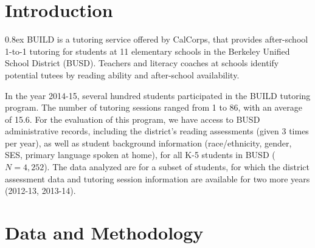 \documentclass[a0,landscape]{a0poster}
\begin{document}
\vspace{0.5cm} %



\begin{multicols}{3} %



\color{SaddleBrown} %

\section*{Introduction}

\parskip 0.8ex
BUILD is a tutoring service offered by CalCorps, that provides
after-school 1-to-1 tutoring for students at 11 elementary schools
in the Berkeley Unified School District (BUSD).
Teachers and literacy coaches at schools identify potential tutees
by reading ability and after-school availability.

In the year 2014-15, several hundred students participated in the
BUILD tutoring program. The number of tutoring sessions ranged
from 1 to 86, with an average of 15.6.
For the evaluation of this program, we have access to BUSD
administrative records, including the district's reading assessments
(given 3 times per year), as well as student background information
(race/ethnicity, gender, SES, primary language spoken at home),
for all K-5 students in BUSD ($N = 4,252$).
The data analyzed are for a subset of students, for which the district
assessment data and tutoring session information are available
for two more years (2012-13, 2013-14).


\color{NavyBlue}
\section*{Data and Methodology}


\end{multicols}
\end{document}

